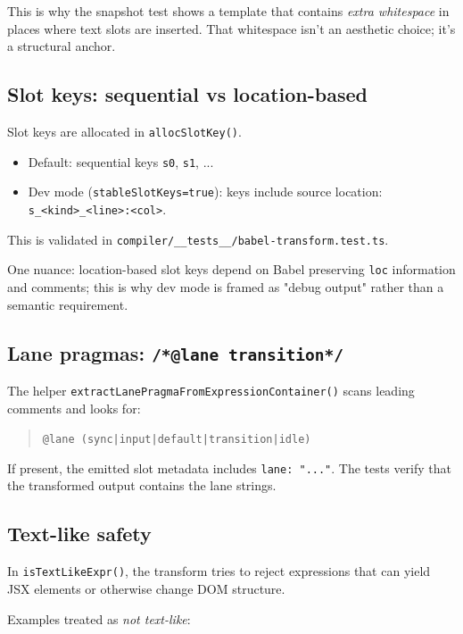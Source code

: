 This is why the snapshot test shows a template that contains \emph{extra whitespace} in places where text slots are inserted. That whitespace isn't an aesthetic choice; it's a structural anchor.

\subsection{Slot keys: sequential vs location-based}

Slot keys are allocated in \texttt{allocSlotKey()}.

\begin{itemize}
\item Default: sequential keys \texttt{s0}, \texttt{s1}, ...
\item Dev mode (\texttt{stableSlotKeys=true}): keys include source location: \texttt{s\_\textless{}kind\textgreater{}\_\textless{}line\textgreater:\textless{}col\textgreater}.
\end{itemize}

This is validated in \texttt{compiler/\_\_tests\_\_/babel-transform.test.ts}.

One nuance: location-based slot keys depend on Babel preserving \texttt{loc} information and comments; this is why dev mode is framed as "debug output" rather than a semantic requirement.

\subsection{Lane pragmas: \texttt{/*@lane transition*/}}

The helper \texttt{extractLanePragmaFromExpressionContainer()} scans leading comments and looks for:

\begin{quote}
\texttt{@lane (sync|input|default|transition|idle)}
\end{quote}

If present, the emitted slot metadata includes \texttt{lane: "..."}.
The tests verify that the transformed output contains the lane strings.

\subsection{Text-like safety}

In \texttt{isTextLikeExpr()}, the transform tries to reject expressions that can yield JSX elements or otherwise change DOM structure.

Examples treated as \emph{not text-like}:

